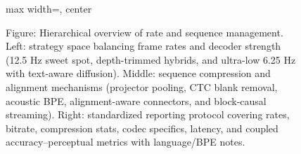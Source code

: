 \begin{figure}[h]
\begin{adjustbox}{max width=\textwidth, center}
\begin{tikzpicture}
\end{tikzpicture}
\end{adjustbox}

\caption{Figure: Hierarchical overview of rate and sequence management. Left: strategy space balancing frame rates and decoder strength (12.5 Hz sweet spot, depth-trimmed hybrids, and ultra-low 6.25 Hz with text-aware diffusion). Middle: sequence compression and alignment mechanisms (projector pooling, CTC blank removal, acoustic BPE, alignment-aware connectors, and block-causal streaming). Right: standardized reporting protocol covering rates, bitrate, compression stats, codec specifics, latency, and coupled accuracy–perceptual metrics with language/BPE notes.}
\label{fig:tiny_tree_figure_0}

\end{figure}